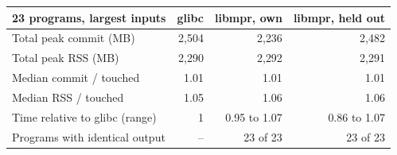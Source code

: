 \begin{tabular}{lrrr}
\toprule
23 programs, largest inputs & glibc & libmpr, own & libmpr, held out \\
\midrule
Total peak commit (MB) & 2{,}504 & 2{,}236 & 2{,}482 \\
Total peak RSS (MB) & 2{,}290 & 2{,}292 & 2{,}291 \\
Median commit / touched & 1.01 & 1.01 & 1.01 \\
Median RSS / touched & 1.05 & 1.06 & 1.06 \\
Time relative to glibc (range) & 1 & 0.95 to 1.07 & 0.86 to 1.07 \\
Programs with identical output & -- & 23 of 23 & 23 of 23 \\
\bottomrule
\end{tabular}
